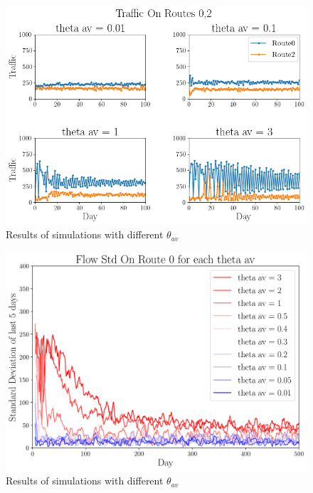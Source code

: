 \documentclass[12pt, a4paper, onecolumn]{article}
\begin{document}
\begin{figure}[h!]
	\centering
	\includegraphics[scale=.5]{av_th_grid.png}
	\caption{Results of simulations with different $\theta_{av}$}
	\label{fig:avthgrid}
	\end{figure}

\begin{figure}[h!]
	\centering
	\includegraphics[scale=.5]{av_th_std.png}
	\caption{Results of simulations with different $\theta_{av}$}
	\label{fig:avthstd}
	\end{figure}
\end{document}
